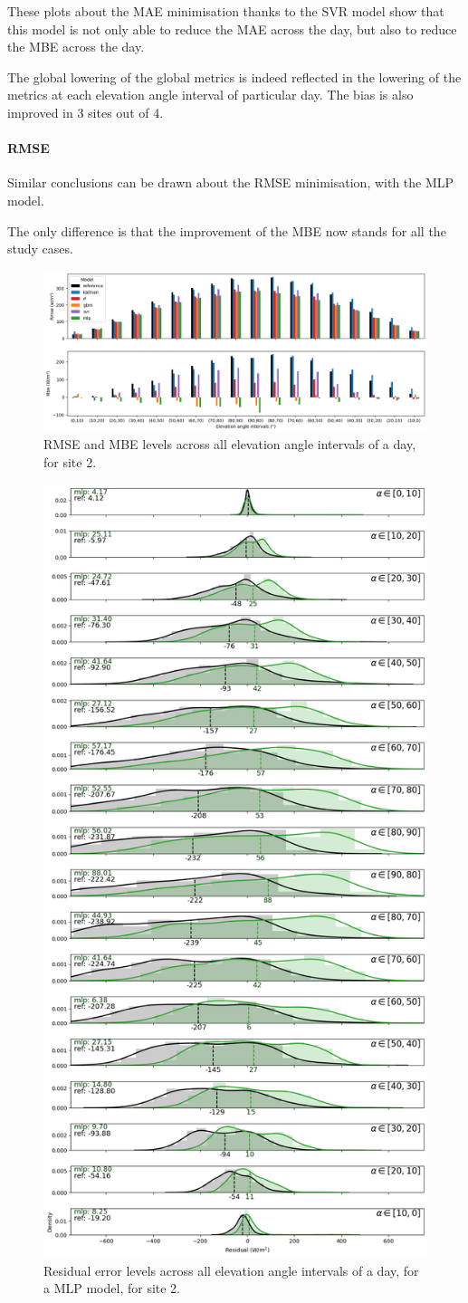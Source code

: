 These plots about the MAE minimisation thanks to the SVR model show that this model is not only able to reduce the MAE across the day, but also to reduce the MBE across the day.

The global lowering of the global metrics is indeed reflected in the lowering of the metrics at each elevation angle interval of particular day. The bias is also improved in 3 sites out of 4.
\paragraph{RMSE}\indent

Similar conclusions can be drawn about the RMSE minimisation, with the MLP model.

The only difference is that the improvement of the MBE now stands for all the study cases.

\begin{figure}[htb!]
    \centering
    \includegraphics[width=\columnwidth]{figures/first_study/rmse_mbe_site2.png}
\caption{RMSE and MBE levels across all elevation angle intervals of a day, for site 2.}
\end{figure}
\newpage

\begin{figure}[htb!]
    \centering
    \includegraphics[width=0.47\columnwidth]{figures/first_study/residual_errors_mlp_site2_rmse.png}
\caption{Residual error levels across all elevation angle intervals of a day, for a MLP model, for site 2.}
\end{figure}

